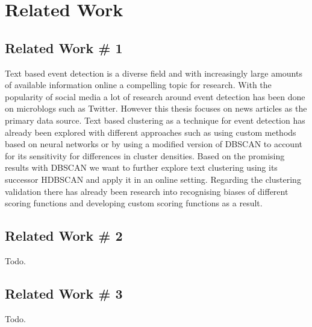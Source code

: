 \section{Related Work}

\subsection{Related Work \# 1}
Text based event detection is a diverse field and with increasingly large amounts of available information online a compelling topic for research.
With the popularity of social media a lot of research around event detection has been done on microblogs\cite{microblog_clustering} such as Twitter\cite{twitter_survey}\cite{social_media_survey}.
However this thesis focuses on news articles as the primary data source.
Text based clustering as a technique for event detection has already been explored with different approaches such as using custom methods based on neural networks\cite{text_clustering_topic_detection}
or by using a modified version of DBSCAN to account for its sensitivity for differences in cluster densities\cite{dbscan_martingale}.
Based on the promising results with DBSCAN we want to further explore text clustering using its successor HDBSCAN\cite{McInnes2017} and apply it in an online setting.
Regarding the clustering validation there has already been research into recognising biases of different scoring functions \cite{Wu:2009:ARM:1557019.1557115}
and developing custom scoring functions as a result\cite{gates2017comparing}.

\subsection{Related Work \# 2}
Todo.

\subsection{Related Work \# 3}
Todo.
